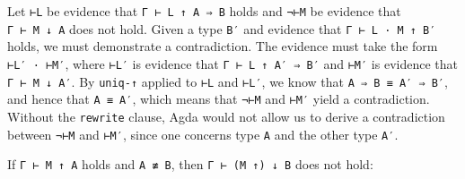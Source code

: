 Let \texttt{⊢L} be evidence that \texttt{Γ\ ⊢\ L\ ↑\ A\ ⇒\ B} holds and
\texttt{¬⊢M} be evidence that \texttt{Γ\ ⊢\ M\ ↓\ A} does not hold.
Given a type \texttt{B′} and evidence that \texttt{Γ\ ⊢\ L\ ·\ M\ ↑\ B′}
holds, we must demonstrate a contradiction. The evidence must take the
form \texttt{⊢L′\ ·\ ⊢M′}, where \texttt{⊢L′} is evidence that
\texttt{Γ\ ⊢\ L\ ↑\ A′\ ⇒\ B′} and \texttt{⊢M′} is evidence that
\texttt{Γ\ ⊢\ M\ ↓\ A′}. By \texttt{uniq-↑} applied to \texttt{⊢L} and
\texttt{⊢L′}, we know that \texttt{A\ ⇒\ B\ ≡\ A′\ ⇒\ B′}, and hence
that \texttt{A\ ≡\ A′}, which means that \texttt{¬⊢M} and \texttt{⊢M′}
yield a contradiction. Without the \texttt{rewrite} clause, Agda would
not allow us to derive a contradiction between \texttt{¬⊢M} and
\texttt{⊢M′}, since one concerns type \texttt{A} and the other type
\texttt{A′}.

If \texttt{Γ\ ⊢\ M\ ↑\ A} holds and \texttt{A\ ≢\ B}, then
\texttt{Γ\ ⊢\ (M\ ↑)\ ↓\ B} does not hold:

\begin{fence}
\begin{code}%
\>[0]\AgdaSpace{}%
\AgdaSymbol{:}\AgdaSpace{}%
\AgdaSpace{}%
\AgdaSymbol{\{}\AgdaSpace{}%
\AgdaSpace{}%
\AgdaSpace{}%
\AgdaSymbol{\}}\<%
\\
\>[0][@{}l@{\AgdaIndent{0}}]%
\>[2]\AgdaSpace{}%
\AgdaSpace{}%
\AgdaSpace{}%
\AgdaSpace{}%
\AgdaSpace{}%
\<%
\\
%
\>[2]%
\>[900I]\AgdaSpace{}%
\AgdaSpace{}%
\<%
\\
\>[.][@{}l@{}]\<[900I]%
\>[4]\AgdaComment{---------------}\<%
\\
%
\>[2]\AgdaSpace{}%
\AgdaSpace{}%
\AgdaSpace{}%
\AgdaSpace{}%
\AgdaSymbol{(}\AgdaSpace{}%
\AgdaSymbol{)}\AgdaSpace{}%
\AgdaSpace{}%
\<%
\\
\>[0]\AgdaSpace{}%
\AgdaSpace{}%
\AgdaSpace{}%
\AgdaSymbol{(}\AgdaSpace{}%
\AgdaSpace{}%
\AgdaSymbol{)}\AgdaSpace{}%
\AgdaSpace{}%
\AgdaSpace{}%
\AgdaSpace{}%
\AgdaSpace{}%
\AgdaSymbol{=}\AgdaSpace{}%
\AgdaSpace{}%
\<%
\end{code}
\end{fence}

